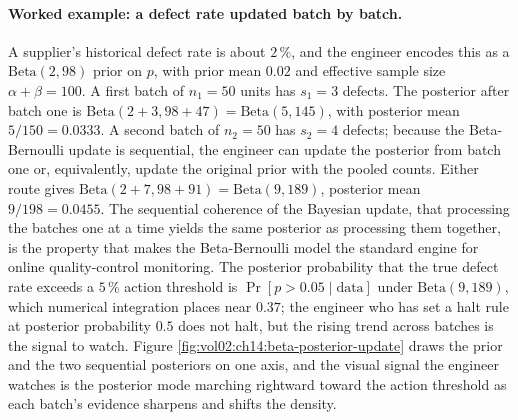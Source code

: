 \paragraph{Worked example: a defect rate updated batch by batch.}
A supplier's historical defect rate is about $2\,\%$, and the
engineer encodes this as a $\mathrm{Beta}(2, 98)$ prior on $p$,
with prior mean $0.02$ and effective sample size $\alpha + \beta =
100$. A first batch of $n_{1} = 50$ units has $s_{1} = 3$ defects.
The posterior after batch one is $\mathrm{Beta}(2 + 3, 98 + 47) =
\mathrm{Beta}(5, 145)$, with posterior mean $5/150 = 0.0333$. A
second batch of $n_{2} = 50$ has $s_{2} = 4$ defects; because the
Beta-Bernoulli update is sequential, the engineer can update the
posterior from batch one or, equivalently, update the original
prior with the pooled counts. Either route gives
$\mathrm{Beta}(2 + 7, 98 + 91) = \mathrm{Beta}(9, 189)$, posterior
mean $9/198 = 0.0455$. The sequential coherence of the Bayesian
update, that processing the batches one at a time yields the same
posterior as processing them together, is the property that makes
the Beta-Bernoulli model the standard engine for online
quality-control monitoring. The posterior probability that the
true defect rate exceeds a $5\,\%$ action threshold is
$\Pr[p > 0.05 \mid \text{data}]$ under $\mathrm{Beta}(9, 189)$,
which numerical integration places near $0.37$; the engineer who
has set a halt rule at posterior probability $0.5$ does not halt,
but the rising trend across batches is the signal to watch. Figure
\ref{fig:vol02:ch14:beta-posterior-update} draws the prior and the two
sequential posteriors on one axis, and the visual signal the engineer
watches is the posterior mode marching rightward toward the action
threshold as each batch's evidence sharpens and shifts the density.



